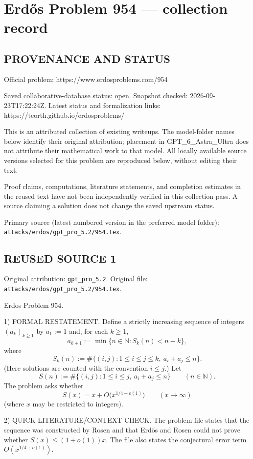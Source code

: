 \section*{Erd\H{o}s Problem 954 --- collection record}

\subsection*{PROVENANCE AND STATUS}
Official problem: https://www.erdosproblems.com/954

Saved collaborative-database status: open.
Snapshot checked: 2026-09-23T17:22:24Z.
Latest status and formalization links: https://teorth.github.io/erdosproblems/

This is an attributed collection of existing writeups. The model-folder names below identify their original attribution; placement in GPT\_6\_Astra\_Ultra does not attribute their mathematical work to that model. All locally available source versions selected for this problem are reproduced below, without editing their text.

Proof claims, computations, literature statements, and completion estimates in the reused text have not been independently verified in this collection pass. A source claiming a solution does not change the saved upstream status.

Primary source (latest numbered version in the preferred model folder): \texttt{attacks/erdos/gpt\_pro\_5.2/954.tex}.

\subsection*{REUSED SOURCE 1}
Original attribution: \texttt{gpt\_pro\_5.2}.
Original file: \texttt{attacks/erdos/gpt\_pro\_5.2/954.tex}.



Erdos Problem 954.

1) FORMAL RESTATEMENT.
Define a strictly increasing sequence of integers $(a_k)_{k\ge 1}$ by
$a_1:=1$ and, for each $k\ge 1$,
\[
 a_{k+1}:=\min\{n\in\mathbb{N}: S_k(n) < n-k\},
\]
where
\[
S_k(n):=\#\{(i,j):1\le i\le j\le k,\ a_i+a_j\le n\}.
\]
(Here solutions are counted with the convention $i\le j$.)
Let
\[
S(n):=\#\{(i,j):1\le i\le j,\ a_i+a_j\le n\}\qquad(n\in\mathbb{N}).
\]
The problem asks whether
\[
S(x)=x+O\bigl(x^{1/4+o(1)}\bigr)\qquad(x\to\infty)
\]
(where $x$ may be restricted to integers).

2) QUICK LITERATURE/CONTEXT CHECK.
The problem file states that the sequence was constructed by Rosen and that Erd\H{o}s and Rosen could not prove whether $S(x)\le (1+o(1))x$. The file also states the conjectural error term $O(x^{1/4+o(1)})$.

